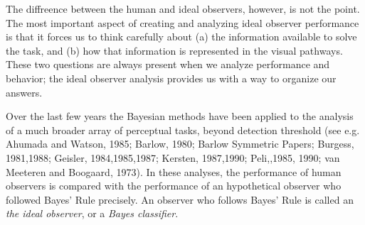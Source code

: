 The diffreence between the human and ideal observers, however,
is not the point.
The most important aspect of creating
and analyzing ideal observer performance
is that it forces us to think carefully
about (a) the information available to solve the task,
and (b) how that information is represented in the visual pathways.
These two questions are always present when we analyze performance
and behavior;
the ideal observer analysis provides us with a way to
organize our answers.




Over the last few years the Bayesian methods have been
applied to the analysis of a much broader array
of perceptual tasks, beyond detection threshold
(see e.g. 
Ahumada and Watson, 1985;
Barlow, 1980;
Barlow Symmetric Papers;
Burgess, 1981,1988;
Geisler, 1984,1985,1987;
Kersten, 1987,1990;
Peli,,1985, 1990;
van Meeteren and Boogaard, 1973).
In these analyses, the performance of human observers
is compared with the performance of
an hypothetical observer who followed Bayes' Rule precisely.
An observer who follows Bayes' Rule
is called an {\em the ideal observer}, or a
{\em Bayes classifier}.


